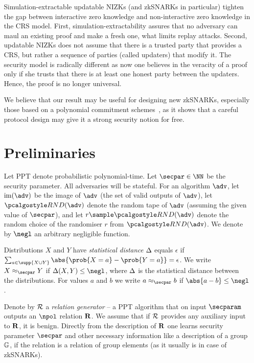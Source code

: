 \documentclass[runningheads]{llncs}
\theoremstyle{definition}
\begin{document}
Simulation-extractable updatable NIZKs (and zkSNARKs in particular) tighten the gap between interactive zero knowledge and non-interactive zero knowledge in the CRS model. 
First, simulation-extractability assures that no adversary can maul an existing proof and make a fresh one, what limits replay attacks.
Second, updatable NIZKs does not assume that there is a trusted party that provides a CRS, but rather a sequence of parties (called updaters) that modify it. The security model is radically different as now one believes in the veracity of a proof only if she trusts that there is at least one honest party between the updaters. Hence, the proof is no longer universal.

We believe that our result may be useful for designing new zkSNARKs, especially those based on a polynomial commitment schemes~\cite{AC:KatZavGol10}, as it shows that a careful protocol design may give it a strong security notion for free.

\section{Preliminaries}
Let PPT denote probabilistic polynomial-time.
Let $\secpar \in \NN$ be the security parameter.
All adversaries will be stateful.
For an algorithm $\adv$, let $\image (\adv)$ be the image of $\adv$ (the set of valid outputs of $\adv$), let $\RND{\adv}$ denote the random tape of $\adv$ (assuming the given value of $\secpar$), and let $r \sample \RND{\adv}$ denote the random choice of the randomiser $r$ from $\RND{\adv}$.
We denote by $\negl$ an arbitrary negligible function.

Distributions $X$ and $Y$ have \emph{statistical distance} $\Delta$ equals $\epsilon$ if $\sum_{a \in \supp{X \cup Y}} \abs{\prob{X = a} - \prob{Y = a}} = \epsilon$.
We write $X \approx_\secpar Y$ if $\SD(X, Y) \leq \negl$, where $\Delta$ is the statistical distance between the distributions.
For values $a$ and $b$ we write $a \approx_\secpar b$ if $\abs{a - b} \leq \negl$. 

Denote by $\mathcal{R}$ a \emph{relation generator} -- a PPT algorithm that on input $\secparam$ outputs an $\npol$ relation $\mathbf{R}$. We assume that if $\mathcal{R}$ provides any auxiliary input to $\mathbf{R}$, it is benign. Directly from the description of $\mathbf{R}$ one learns security parameter $\secpar$ and other necessary information like a description of a group $\mathbb{G}$, if the relation is a relation of group elements (as it usually is in case of zkSNARKs).
\end{document}
